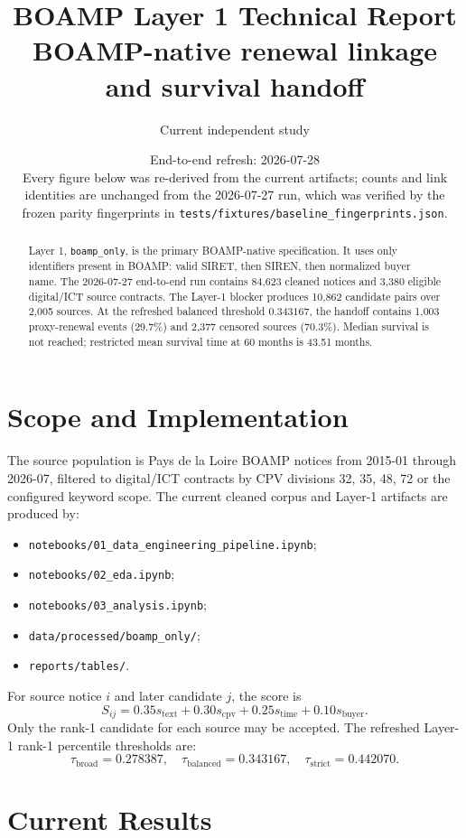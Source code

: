 \documentclass[11pt]{article}
\title{BOAMP Layer 1 Technical Report\\
\large BOAMP-native renewal linkage and survival handoff}
\author{Current independent study}
\date{End-to-end refresh: 2026-07-28\\
\small Every figure below was re-derived from the current artifacts; counts and link
identities are unchanged from the 2026-07-27 run, which was verified by the frozen
parity fingerprints in \texttt{tests/fixtures/baseline\_fingerprints.json}.}
\begin{document}
\maketitle

\begin{abstract}
Layer 1, \texttt{boamp\_only}, is the primary BOAMP-native specification. It
uses only identifiers present in BOAMP: valid SIRET, then SIREN, then normalized
buyer name. The 2026-07-27 end-to-end run contains 84{,}623 cleaned notices and
3{,}380 eligible digital/ICT source contracts. The Layer-1 blocker produces
10{,}862 candidate pairs over 2{,}005 sources. At the refreshed balanced
threshold \(0.343167\), the handoff contains 1{,}003 proxy-renewal events
(29.7\%) and 2{,}377 censored sources (70.3\%). Median survival is not reached;
restricted mean survival time at 60 months is 43.51 months.
\end{abstract}

\section{Scope and Implementation}

The source population is Pays de la Loire BOAMP notices from 2015-01 through
2026-07, filtered to digital/ICT contracts by CPV divisions 32, 35, 48, 72 or
the configured keyword scope. The current cleaned corpus and Layer-1 artifacts
are produced by:
\begin{itemize}
    \item \texttt{notebooks/01\_data\_engineering\_pipeline.ipynb};
    \item \texttt{notebooks/02\_eda.ipynb};
    \item \texttt{notebooks/03\_analysis.ipynb};
    \item \texttt{data/processed/boamp\_only/};
    \item \texttt{reports/tables/}.
\end{itemize}

For source notice \(i\) and later candidate \(j\), the score is
\[
S_{ij}=0.35s_{\mathrm{text}}+0.30s_{\mathrm{cpv}}+0.25s_{\mathrm{time}}+0.10s_{\mathrm{buyer}}.
\]
Only the rank-1 candidate for each source may be accepted. The refreshed
Layer-1 rank-1 percentile thresholds are:
\[
\tau_{\mathrm{broad}}=0.278387,\quad
\tau_{\mathrm{balanced}}=0.343167,\quad
\tau_{\mathrm{strict}}=0.442070.
\]

\section{Current Results}
\end{document}
